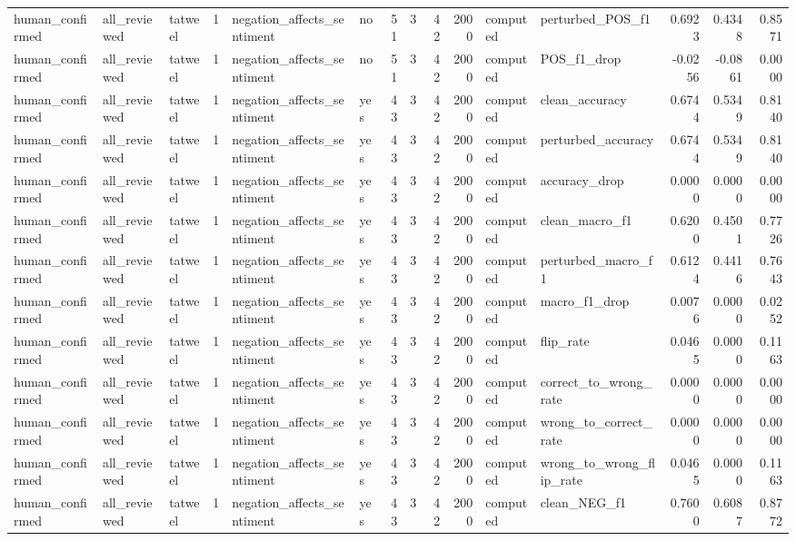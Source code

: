 \begin{tabular}{lllrllrrrrllrrr}
human_confirmed & all_reviewed & tatweel & 1 & negation_affects_sentiment & no & 51 & 3 & 42 & 2000 & computed & perturbed_POS_f1 & 0.6923 & 0.4348 & 0.8571 \\
human_confirmed & all_reviewed & tatweel & 1 & negation_affects_sentiment & no & 51 & 3 & 42 & 2000 & computed & POS_f1_drop & -0.0256 & -0.0861 & 0.0000 \\
human_confirmed & all_reviewed & tatweel & 1 & negation_affects_sentiment & yes & 43 & 3 & 42 & 2000 & computed & clean_accuracy & 0.6744 & 0.5349 & 0.8140 \\
human_confirmed & all_reviewed & tatweel & 1 & negation_affects_sentiment & yes & 43 & 3 & 42 & 2000 & computed & perturbed_accuracy & 0.6744 & 0.5349 & 0.8140 \\
human_confirmed & all_reviewed & tatweel & 1 & negation_affects_sentiment & yes & 43 & 3 & 42 & 2000 & computed & accuracy_drop & 0.0000 & 0.0000 & 0.0000 \\
human_confirmed & all_reviewed & tatweel & 1 & negation_affects_sentiment & yes & 43 & 3 & 42 & 2000 & computed & clean_macro_f1 & 0.6200 & 0.4501 & 0.7726 \\
human_confirmed & all_reviewed & tatweel & 1 & negation_affects_sentiment & yes & 43 & 3 & 42 & 2000 & computed & perturbed_macro_f1 & 0.6124 & 0.4416 & 0.7643 \\
human_confirmed & all_reviewed & tatweel & 1 & negation_affects_sentiment & yes & 43 & 3 & 42 & 2000 & computed & macro_f1_drop & 0.0076 & 0.0000 & 0.0252 \\
human_confirmed & all_reviewed & tatweel & 1 & negation_affects_sentiment & yes & 43 & 3 & 42 & 2000 & computed & flip_rate & 0.0465 & 0.0000 & 0.1163 \\
human_confirmed & all_reviewed & tatweel & 1 & negation_affects_sentiment & yes & 43 & 3 & 42 & 2000 & computed & correct_to_wrong_rate & 0.0000 & 0.0000 & 0.0000 \\
human_confirmed & all_reviewed & tatweel & 1 & negation_affects_sentiment & yes & 43 & 3 & 42 & 2000 & computed & wrong_to_correct_rate & 0.0000 & 0.0000 & 0.0000 \\
human_confirmed & all_reviewed & tatweel & 1 & negation_affects_sentiment & yes & 43 & 3 & 42 & 2000 & computed & wrong_to_wrong_flip_rate & 0.0465 & 0.0000 & 0.1163 \\
human_confirmed & all_reviewed & tatweel & 1 & negation_affects_sentiment & yes & 43 & 3 & 42 & 2000 & computed & clean_NEG_f1 & 0.7600 & 0.6087 & 0.8772 \\

\end{tabular}

